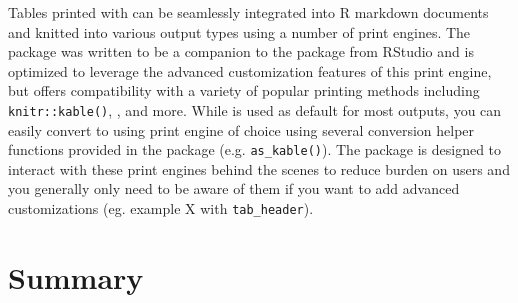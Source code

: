 Tables printed with  can be seamlessly integrated into R markdown documents and knitted into various output types using a number of print engines.
The package was written to be a companion to the  package from RStudio and is optimized to leverage the advanced customization features of this print engine, but offers compatibility with a variety of popular printing methods including \texttt{knitr::kable()}, ,  and more.
While  is used as default for most outputs, you can easily convert to using print engine of choice using several conversion helper functions provided in the package (e.g. \texttt{as\_kable()}).
The package is designed to interact with these print engines behind the scenes to reduce burden on users and you generally only need to be aware of them if you want to add advanced customizations (eg. example X with \texttt{tab\_header}). 


\section{Summary}



\address{Daniel D. Sjoberg\\
  Memorial Sloan Kettering Cancer Center\\
  1275 York Ave., New York, New York 10022\\
  USA\\
  ORCiD: 0000-0003-0862-2018\\
  }

\address{Karissa Whiting\\
  Memorial Sloan Kettering Cancer Center\\
  1275 York Ave., New York, New York 10022\\
  USA\\
  ORCiD: 0000-0002-4683-1868\\
  }

\address{Michael Curry\\
  Memorial Sloan Kettering Cancer Center\\
  1275 York Ave., New York, New York 10022\\
  USA\\
  ORCiD: 0000-0002-0261-4044\\
  }
